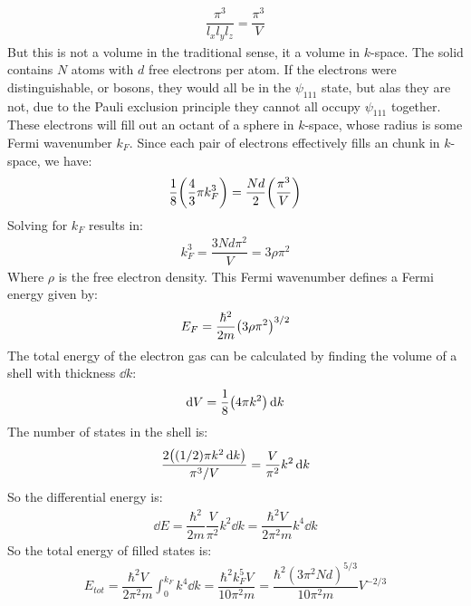 \begin{align*}
  \dfrac{\pi^3}{l_xl_yl_z}=\dfrac{\pi^3}{V}
\end{align*}
But this is not a volume in the traditional sense, it a volume in $k$-space. The solid contains $N$ atoms with $d$ free electrons per atom. If the electrons were distinguishable, or bosons, they would all be in the $\psi_{111}$ state, but alas they are not, due to the Pauli exclusion principle they cannot all occupy $\psi_{111}$ together. These electrons will fill out an octant of a sphere in $k$-space, whose radius is some Fermi wavenumber $k_F$. Since each pair of electrons effectively fills an chunk in $k$-space, we have:
\begin{align*}
  \dfrac{1}{8}\qty(\dfrac{4}{3}\pi k_F^3)=\dfrac{Nd}{2}\qty(\dfrac{\pi^3}{V})
\end{align*}
Solving for $k_F$ results in:
\begin{align*}
  k_F^3=\dfrac{3Nd\pi^2}{V}=3\rho\pi^2
\end{align*}
Where $\rho$ is the free electron density. This Fermi wavenumber defines a Fermi energy given by:
\begin{align*}
  E_F=\dfrac{\hbar^2}{2m}\qty(3\rho\pi^2)^{3/2}
\end{align*}
The total energy of the electron gas can be calculated by finding the volume of a shell with thickness $\dd{k}$:
\begin{align*}
  \dd{V}=\dfrac{1}{8}\qty(4\pi k^2)\dd{k}
\end{align*}
The number of states in the shell is:
\begin{align*}
  \dfrac{2\qty((1/2)\pi k^2\dd{k})}{\pi^3/V}=\dfrac{V}{\pi^2}k^2\dd{k}
\end{align*}
So the differential energy is:
\begin{align*}
  \dd{E}=\dfrac{\hbar^2}{2m}\dfrac{V}{\pi^2}k^2\dd{k}=\dfrac{\hbar^2V}{2\pi^2m}k^4\dd{k}
\end{align*}
So the total energy of filled states is:
\begin{align*}
  E_{tot}=\dfrac{\hbar^2V}{2\pi^2m}\int_0^{k_F}k^4\dd{k}=\dfrac{\hbar^2k_F^5V}{10\pi^2m}=
  \dfrac{\hbar^2(3\pi^2Nd)^{5/3}}{10\pi^2m}V^{-2/3}
\end{align*}
